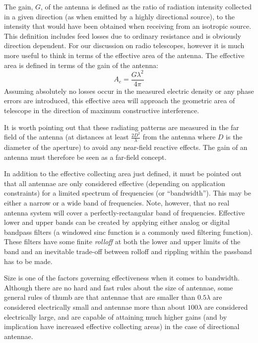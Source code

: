 \documentclass[a4paper,10pt]{report}
\begin{document}
The gain, $G$, of the antenna is defined as the ratio of radiation intensity collected in a given direction (as when emitted by a highly 
directional source), to the intensity that would have been obtained when receiving from an isotropic source. This definition includes feed losses
due to ordinary resistance and is obviously direction dependent. For our discussion on radio telescopes, however it is much more useful to think in terms of 
the effective area of the antenna. The effective area is defined in terms of the gain of the antenna:
\begin{equation*}
 A_e = \frac{G\lambda^2}{4\pi}
\end{equation*}
Assuming absolutely no losses occur in the measured electric density or any phase errors are introduced, this effective area will approach the geometric area of telescope in the direction
of maximum constructive interference. 

It is worth pointing out that these radiating patterns are measured in the far field of the antenna (at distances at least $\frac{2D^2}{\lambda}$ from
the antenna where $D$ is the diameter of the aperture) to avoid any near-field reactive effects. The gain of an antenna must therefore be seen as a 
far-field concept.

In addition to the effective collecting area just defined, it must be pointed out that all antennae are only considered 
effective (depending on application constraints) for a limited spectrum of frequencies (or ``bandwidth''). This may be 
either a narrow or a wide band of frequencies. Note, however, that no real antenna system will cover a perfectly-rectangular band 
of frequencies. Effective lower and upper bands can be created by applying either analog or digital bandpass filters 
(a windowed sinc function is a commonly used filtering function). These filters have some finite \textit{rolloff} at both 
the lower and upper limits of the band and an inevitable trade-off between rolloff and rippling within the passband has to be made. 

Size is one of the factors governing effectiveness when it comes to bandwidth. Although there are no hard and fast rules about the size of antennae, 
some general rules of thumb are that antennae that are smaller than $0.5\lambda$ are considered electrically small and antennae more than 
about $100\lambda$ are considered electrically large, and are capable of attaining much higher gains (and by implication have increased effective 
collecting areas) in the case of directional antennae. 
\end{document}
